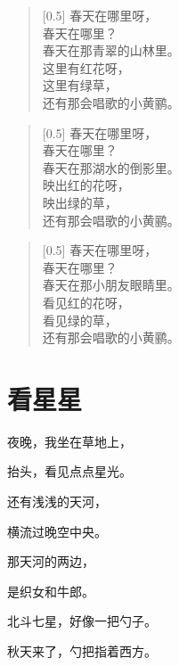 \documentclass[12pt,UTF-8,openany]{ctexbook}
\begin{document}
\begin{large}
    
    \begin{verse}[0.5\linewidth]
        春天在哪里呀， \\
        春天在哪里？ \\
        春天在那青翠的山林里。 \\
        这里有红花呀， \\
        这里有绿草， \\
        还有那会唱歌的小黄鹂。
    \end{verse}
    
    
    \begin{verse}[0.5\linewidth]
        春天在哪里呀， \\
        春天在哪里？ \\
        春天在那湖水的倒影里。 \\
        映出红的花呀， \\
        映出绿的草， \\
        还有那会唱歌的小黄鹂。
    \end{verse}
    
    
    \begin{verse}[0.5\linewidth]
        春天在哪里呀， \\
        春天在哪里？ \\
        春天在那小朋友眼睛里。 \\
        看见红的花呀， \\
        看见绿的草， \\
        还有那会唱歌的小黄鹂。
    \end{verse}
    
\end{large}





\chapter{看星星}

\begin{large}
    
    夜晚，我坐在草地上，
    
    抬头，看见点点星光。
    
    还有浅浅的天河，
    
    横流过晚空中央。
    
    那天河的两边，
    
    是织女和牛郎。
    
    北斗七星，好像一把勺子。
    
    秋天来了，勺把指着西方。
    
\end{large}
\end{document}
